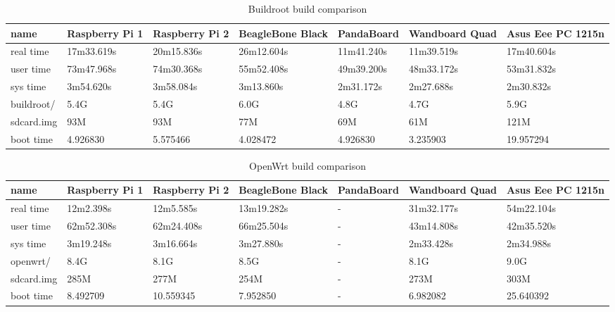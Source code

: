 \documentclass[printmode]{mgr}
\begin{document}
\begin{table}
  \begin{tabular}{| p{2cm} | p{2cm} | p{2cm} | p{2cm} | p{2cm} | p{2cm} | p{2cm} |}
    \hline
    name & Raspberry Pi 1 & Raspberry Pi 2 & BeagleBone Black & PandaBoard & Wandboard Quad & Asus Eee PC 1215n \\
    \hline
    real time & 17m33.619s & 20m15.836s & 26m12.604s & 11m41.240s & 11m39.519s & 17m40.604s \\
    \hline
    user time & 73m47.968s & 74m30.368s & 55m52.408s & 49m39.200s & 48m33.172s & 53m31.832s \\
    \hline
    sys time & 3m54.620s & 3m58.084s & 3m13.860s & 2m31.172s & 2m27.688s & 2m30.832s \\
    \hline
    buildroot/ & 5.4G & 5.4G & 6.0G & 4.8G & 4.7G & 5.9G \\
    \hline
    sdcard.img & 93M & 93M & 77M & 69M & 61M & 121M \\
    \hline
    boot time & 4.926830 & 5.575466 & 4.028472 & 4.926830 & 3.235903 & 19.957294 \\
    \hline
  \end{tabular}
  \caption{Buildroot build comparison}
\end{table}


\begin{table}
  \begin{tabular}{| p{2cm} | p{2cm} | p{2cm} | p{2cm} | p{2cm} | p{2cm} | p{2cm} |}
    \hline
    name & Raspberry Pi 1 & Raspberry Pi 2 & BeagleBone Black & PandaBoard & Wandboard Quad & Asus Eee PC 1215n \\
    \hline
    real time & 12m2.398s & 12m5.585s & 13m19.282s & - & 31m32.177s & 54m22.104s \\
    \hline
    user time & 62m52.308s & 62m24.408s & 66m25.504s & - & 43m14.808s & 42m35.520s \\
    \hline
    sys time & 3m19.248s & 3m16.664s & 3m27.880s & - & 2m33.428s & 2m34.988s \\
    \hline
    openwrt/ & 8.4G & 8.1G & 8.5G & - & 8.1G & 9.0G \\
    \hline
    sdcard.img & 285M & 277M & 254M & - & 273M & 303M \\
    \hline
    boot time & 8.492709 & 10.559345 & 7.952850 & - & 6.982082 & 25.640392 \\
    \hline
  \end{tabular}
  \caption{OpenWrt build comparison}
\end{table}
\end{document}
